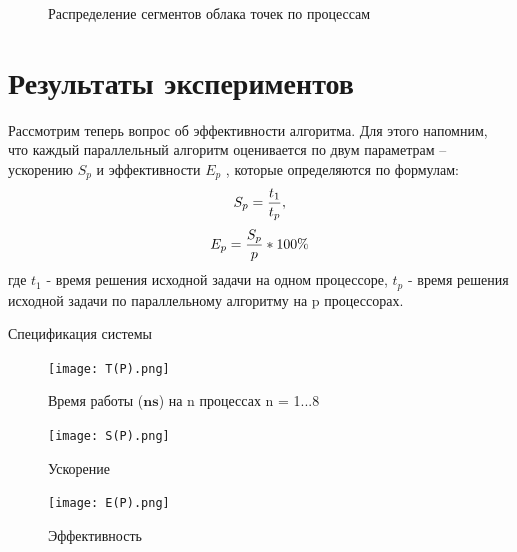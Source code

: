 \begin{figure}
  \centering
  \caption{Распределение сегментов облака точек по процессам}
\end{figure}


\section{Результаты экспериментов}

Рассмотрим теперь вопрос об эффективности алгоритма. Для этого напомним, что
каждый параллельный алгоритм оценивается по двум параметрам – ускорению $S_p$ и
эффективности $E_p$ , которые определяются по формулам:
$$S_p = {{t_1} \over {t_p}},$$ $$E_p = {S_p \over p} * 100\%$$
где $t_1$ - время решения исходной задачи на одном процессоре, $t_p$ - время
решения исходной задачи по параллельному алгоритму на p процессорах.

Спецификация системы \\


\begin{figure}[h]
    \centering
    \texttt{[image: T(P).png]}
    \caption{Время работы ($\mathbf{ns}$) на n процессах n = 1...8}
    \label{fig:mesh1}
\end{figure}

\begin{figure}[h]
    \centering
    \texttt{[image: S(P).png]}
    \caption{Ускорение}
    \label{fig:mesh1}
\end{figure}

\begin{figure}[h]
    \centering
    \texttt{[image: E(P).png]}
    \caption{Эффективность}
    \label{fig:mesh1}
\end{figure}




